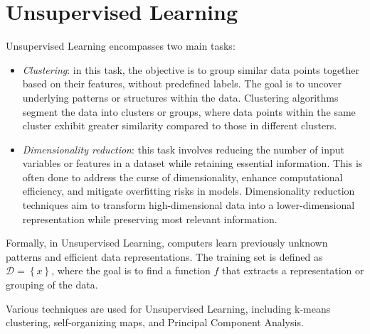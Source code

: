 \section{Unsupervised Learning}

Unsupervised Learning encompasses two main tasks:
\begin{itemize}
    \item \textit{Clustering}: in this task, the objective is to group similar data points together based on their features, without predefined labels. 
        The goal is to uncover underlying patterns or structures within the data. 
        Clustering algorithms segment the data into clusters or groups, where data points within the same cluster exhibit greater similarity compared to those in different clusters. 
    \item \textit{Dimensionality reduction}: this task involves reducing the number of input variables or features in a dataset while retaining essential information. 
        This is often done to address the curse of dimensionality, enhance computational efficiency, and mitigate overfitting risks in models. 
        Dimensionality reduction techniques aim to transform high-dimensional data into a lower-dimensional representation while preserving most relevant information.
\end{itemize}
Formally, in Unsupervised Learning, computers learn previously unknown patterns and efficient data representations.
The training set is defined as $\mathcal{D}=\left\{ x \right\}$, where the goal is to find a function $f$ that extracts a representation or grouping of the data.

Various techniques are used for Unsupervised Learning, including k-means clustering, self-organizing maps, and Principal Component Analysis.
